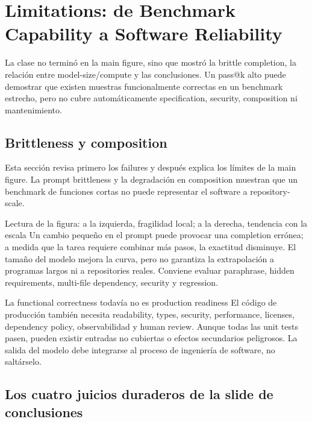 \section{Limitations: de Benchmark Capability a Software Reliability}

La clase no terminó en la main figure, sino que mostró la brittle completion, la relación entre model-size/compute y las conclusiones. Un pass@k alto puede demostrar que existen muestras funcionalmente correctas en un benchmark estrecho, pero no cubre automáticamente specification, security, composition ni mantenimiento.

\subsection{Brittleness y composition}

Esta sección revisa primero los failures y después explica los límites de la main figure. La prompt brittleness y la degradación en composition muestran que un benchmark de funciones cortas no puede representar el software a repository-scale.


\begin{knowledgebox}{Lectura de la figura: a la izquierda, fragilidad local; a la derecha, tendencia con la escala}
Un cambio pequeño en el prompt puede provocar una completion errónea; a medida que la tarea requiere combinar más pasos, la exactitud disminuye. El tamaño del modelo mejora la curva, pero no garantiza la extrapolación a programas largos ni a repositories reales. Conviene evaluar paraphrase, hidden requirements, multi-file dependency, security y regression.
\end{knowledgebox}

\begin{warningbox}{La functional correctness todavía no es production readiness}
El código de producción también necesita readability, types, security, performance, licenses, dependency policy, observabilidad y human review. Aunque todas las unit tests pasen, pueden existir entradas no cubiertas o efectos secundarios peligrosos. La salida del modelo debe integrarse al proceso de ingeniería de software, no saltárselo.
\end{warningbox}

\subsection{Los cuatro juicios duraderos de la slide de conclusiones}

